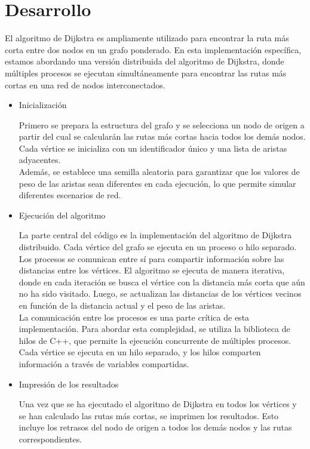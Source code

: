 \documentclass[a4paper,12pt]{article}
\begin{document}
\section*{Desarrollo}

El algoritmo de Dijkstra es ampliamente utilizado para encontrar la ruta más corta entre dos nodos en un grafo ponderado. En esta implementación específica, estamos abordando una versión distribuida del algoritmo de Dijkstra, donde múltiples procesos se ejecutan simultáneamente para encontrar las rutas más cortas en una red de nodos interconectados.


\begin{itemize}
    \item Inicialización

    Primero se prepara la estructura del grafo y se selecciona un nodo de origen a partir del cual se calcularán las rutas más cortas hacia todos los demás nodos. Cada vértice se inicializa con un identificador único y una lista de aristas adyacentes. \\
    
    Además, se establece una semilla aleatoria para garantizar que los valores de peso de las aristas sean diferentes en cada ejecución, lo que permite simular diferentes escenarios de red.

    \item Ejecución del algoritmo

    La parte central del código es la implementación del algoritmo de Dijkstra distribuido. Cada vértice del grafo se ejecuta en un proceso o hilo separado. Los procesos se comunican entre sí para compartir información sobre las distancias entre los vértices. El algoritmo se ejecuta de manera iterativa, donde en cada iteración se busca el vértice con la distancia más corta que aún no ha sido visitado. Luego, se actualizan las distancias de los vértices vecinos en función de la distancia actual y el peso de las aristas. \\

    La comunicación entre los procesos es una parte crítica de esta implementación. Para abordar esta complejidad, se utiliza la biblioteca de hilos de C++, que permite la ejecución concurrente de múltiples procesos. Cada vértice se ejecuta en un hilo separado, y los hilos comparten información a través de variables compartidas.

    \item Impresión de los resultados

    Una vez que se ha ejecutado el algoritmo de Dijkstra en todos los vértices y se han calculado las rutas más cortas, se imprimen los resultados. Esto incluye los retrasos del nodo de origen a todos los demás nodos y las rutas correspondientes.
\end{itemize}
\end{document}
